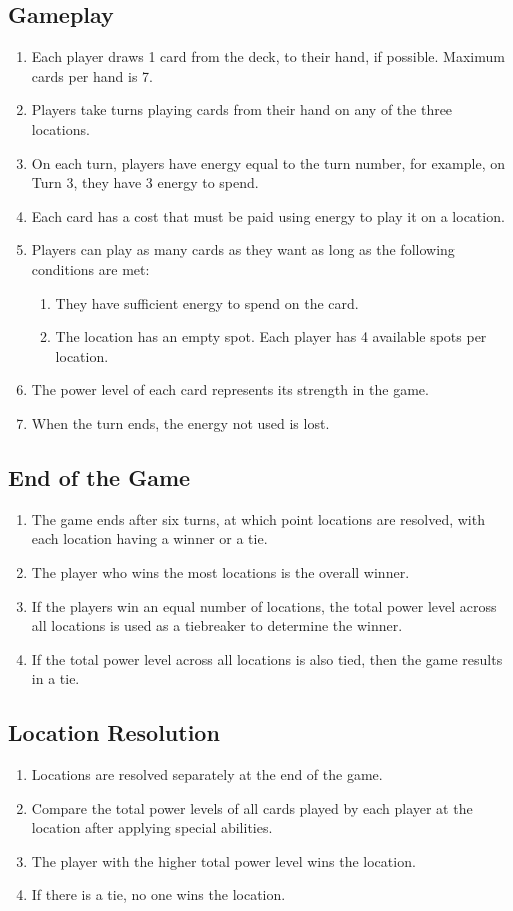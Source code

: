\subsection*{Gameplay}
\begin{enumerate}
  \item Each player draws 1 card from the deck, to their hand, if possible. Maximum cards per hand is 7.
  \item Players take turns playing cards from their hand on any of the three locations.
  \item On each turn, players have energy equal to the turn number, for example, on Turn 3, they have 3 energy to spend.
  \item Each card has a cost that must be paid using energy to play it on a location.
  \item Players can play as many cards as they want as long as the following conditions are met:
  \begin{enumerate}
    \item They have sufficient energy to spend on the card.
    \item The location has an empty spot. Each player has 4 available spots per location.
  \end{enumerate}
  \item The power level of each card represents its strength in the game.
  \item When the turn ends, the energy not used is lost.
\end{enumerate}

\subsection*{End of the Game}
\begin{enumerate}
  \item The game ends after six turns, at which point locations are resolved, with each location having a winner or a tie.
  \item The player who wins the most locations is the overall winner.
  \item If the players win an equal number of locations, the total power level across all locations is used as a tiebreaker to determine the winner.
  \item If the total power level across all locations is also tied, then the game results in a tie.
\end{enumerate}

\subsection*{Location Resolution}
\begin{enumerate}
  \item Locations are resolved separately at the end of the game.
  \item Compare the total power levels of all cards played by each player at the location after applying special abilities.
  \item The player with the higher total power level wins the location.
  \item If there is a tie, no one wins the location.
\end{enumerate}

